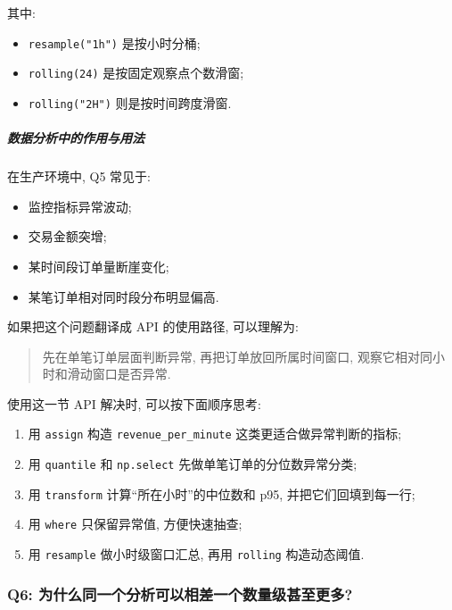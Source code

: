 \documentclass[11pt]{article}
\providecommand{\tightlist}{%
      \setlength{\itemsep}{0pt}\setlength{\parskip}{0pt}}
\begin{document}
其中:

\begin{itemize}
\tightlist
\item
  \texttt{resample("1h")} 是按小时分桶;
\item
  \texttt{rolling(24)} 是按固定观察点个数滑窗;
\item
  \texttt{rolling("2H")} 则是按时间跨度滑窗.
\end{itemize}

    \subparagraph{数据分析中的作用与用法}\label{ux6570ux636eux5206ux6790ux4e2dux7684ux4f5cux7528ux4e0eux7528ux6cd5}

    在生产环境中, Q5 常见于:

\begin{itemize}
\tightlist
\item
  监控指标异常波动;
\item
  交易金额突增;
\item
  某时间段订单量断崖变化;
\item
  某笔订单相对同时段分布明显偏高.
\end{itemize}

如果把这个问题翻译成 API 的使用路径, 可以理解为:

\begin{quote}
先在单笔订单层面判断异常, 再把订单放回所属时间窗口,
观察它相对同小时和滑动窗口是否异常.
\end{quote}

使用这一节 API 解决时, 可以按下面顺序思考:

\begin{enumerate}
\def\labelenumi{\arabic{enumi}.}
\tightlist
\item
  用 \texttt{assign} 构造 \texttt{revenue\_per\_minute}
  这类更适合做异常判断的指标;
\item
  用 \texttt{quantile} 和 \texttt{np.select}
  先做单笔订单的分位数异常分类;
\item
  用 \texttt{transform} 计算``所在小时''的中位数和 p95,
  并把它们回填到每一行;
\item
  用 \texttt{where} 只保留异常值, 方便快速抽查;
\item
  用 \texttt{resample} 做小时级窗口汇总, 再用 \texttt{rolling}
  构造动态阈值.
\end{enumerate}

    \subsubsection{Q6:
为什么同一个分析可以相差一个数量级甚至更多?}\label{q6-ux4e3aux4ec0ux4e48ux540cux4e00ux4e2aux5206ux6790ux53efux4ee5ux76f8ux5deeux4e00ux4e2aux6570ux91cfux7ea7ux751aux81f3ux66f4ux591a}
\end{document}
